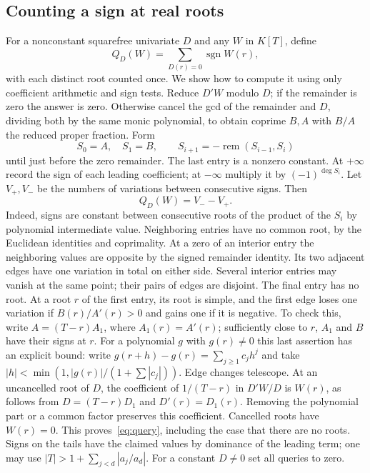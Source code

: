 \subsection{Counting a sign at real roots}
For a nonconstant squarefree univariate $D$ and any $W$ in $K[T]$, define
\[
   Q_D(W)=\sum_{D(r)=0}\operatorname{sgn} W(r),
\]
with each distinct root counted once. We show how to compute it using
only coefficient arithmetic and sign tests. Reduce $D'W$ modulo $D$;
if the remainder is zero the answer is zero. Otherwise cancel the gcd
of the remainder and $D$, dividing both by the same monic polynomial,
to obtain coprime $B,A$ with $B/A$ the reduced proper fraction. Form
\[
 S_0=A,\quad S_1=B,\qquad S_{i+1}=-\operatorname{rem}(S_{i-1},S_i)
\]
until just before the zero remainder. The last entry is a nonzero
constant. At $+\infty$ record the sign of each leading coefficient;
at $-\infty$ multiply it by $(-1)^{\deg S_i}$. Let $V_+,V_-$ be the
numbers of variations between consecutive signs. Then
\begin{equation}
                  Q_D(W)=V_- - V_+.                 \label{eq:query}
\end{equation}
Indeed, signs are constant between consecutive roots of the product
of the $S_i$ by polynomial intermediate value. Neighboring entries
have no common root, by the Euclidean identities and coprimality.
At a zero of an interior entry the neighboring values are opposite
by the signed remainder identity. Its two adjacent edges have one
variation in total on either side. Several interior entries may vanish
at the same point; their pairs of edges are disjoint. The final entry
has no root. At a root $r$ of the first entry, its root is simple,
and the first edge loses one variation if $B(r)/A'(r)>0$ and gains one
if it is negative. To check this, write $A=(T-r)A_1$, where
$A_1(r)=A'(r)$; sufficiently close to $r$, $A_1$ and $B$ have their
signs at $r$. For a polynomial $g$ with $g(r)\ne0$ this last assertion
has an explicit bound: write $g(r+h)-g(r)=\sum_{j\ge1}c_jh^j$ and take
$|h|<\min(1,|g(r)|/(1+\sum|c_j|))$. Edge changes telescope.
At an uncancelled root of $D$, the coefficient of $1/(T-r)$ in
$D'W/D$ is $W(r)$, as follows from $D=(T-r)D_1$ and $D'(r)=D_1(r)$.
Removing the polynomial part or a common factor preserves this coefficient.
Cancelled roots have $W(r)=0$. This proves~\eqref{eq:query}, including
the case that there are no roots. Signs on the tails have the claimed
values by dominance of the leading term; one may use
$|T|>1+\sum_{j<d}|a_j/a_d|$. For a constant $D\ne0$ set all queries to zero.


